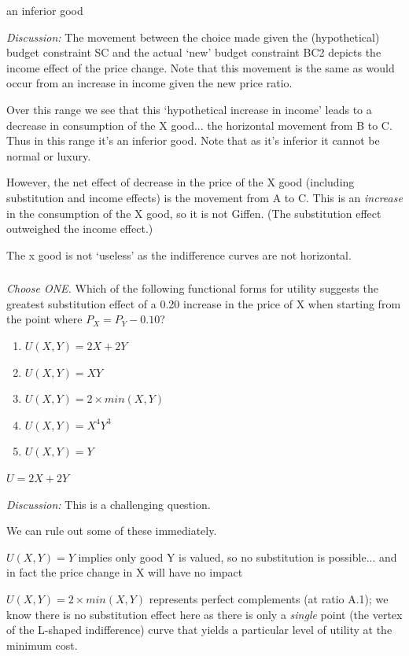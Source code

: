 \documentclass[]{article}
\begin{document}
an inferior good

\emph{Discussion:} The movement between the choice made given the
(hypothetical) budget constraint SC and the actual `new' budget
constraint BC2 depicts the income effect of the price change. Note that
this movement is the same as would occur from an increase in income
given the new price ratio.

Over this range we see that this `hypothetical increase in income' leads
to a decrease in consumption of the X good... the horizontal movement
from B to C. Thus in this range it's an inferior good. Note that as it's
inferior it cannot be normal or luxury.

However, the net effect of decrease in the price of the X good
(including substitution and income effects) is the movement from A to C.
This is an \emph{increase} in the consumption of the X good, so it is
not Giffen. (The substitution effect outweighed the income effect.)

The x good is not `useless' as the indifference curves are not
horizontal.

\hypertarget{section-8}{%
\subsubsection{}\label{section-8}}

{\emph{Choose ONE.}} Which of the following functional forms for utility
suggests the greatest substitution effect of a 0.20 increase in the
price of X when starting from the point where \(P_X =P_Y-0.10\)?

\begin{enumerate}
\def\labelenumi{\Alph{enumi}.}
\item
  \(U(X,Y) =2X+2Y\)
\item
  \(U(X,Y) = XY\)
\item
  \(U(X,Y) = 2 \times min(X,Y)\)
\item
  \(U(X,Y)=X^4Y^3\)
\item
  \(U(X,Y)=Y\)
\end{enumerate}

\(U=2X+2Y\) ~

\emph{Discussion:} This is a challenging question.

We can rule out some of these immediately.

\(U(X,Y)=Y\) implies only good Y is valued, so no substitution is
possible... and in fact the price change in X will have no impact

\(U(X,Y) = 2 \times min(X,Y)\) represents perfect complements (at ratio
A.1); we know there is no substitution effect here as there is only a
\emph{single} point (the vertex of the L-shaped indifference) curve that
yields a particular level of utility at the minimum cost.
\end{document}
